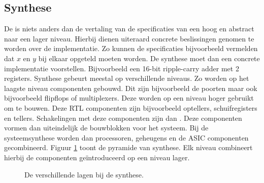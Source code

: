 \subsection{Synthese}
\label{ss:synthese}
De  is niets anders dan de vertaling van de specificaties van een hoog en abstract naar een lager niveau. Hierbij dienen uiteraard concrete beslissingen genomen te worden over de implementatie. Zo kunnen de specificaties bijvoorbeeld vermelden dat $x$ en $y$ bij elkaar opgeteld moeten worden. De synthese moet dan een concrete implementatie voorstellen. Bijvoorbeeld een 16-bit ripple-carry adder met 2 registers. Synthese gebeurt meestal op verschillende niveaus. Zo worden op het laagste niveau componenten gebouwd. Dit zijn bijvoorbeeld de poorten maar ook bijvoorbeeld flipflops of multiplexers. Deze worden op een niveau hoger gebruikt om  te bouwen. Deze RTL componenten zijn bijvoorbeeld optellers, schuifregisters en tellers. Schakelingen met deze componenten zijn dan . Deze componenten vormen dan uiteindelijk de bouwblokken voor het systeem. Bij de systeemsynthese worden dan processoren, geheugens en de ASIC componenten gecombineerd. Figuur \ref{fig:synthesisPyramid} toont de pyramide van synthese. Elk niveau combineert hierbij de componenten ge\"introduceerd op een niveau lager.
\begin{figure}[htb]
\centering
{}
\caption{De verschillende lagen bij de synthese.}
\label{fig:synthesisPyramid}
\end{figure}
